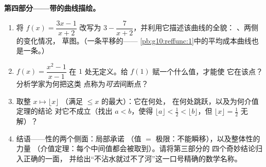 \begin{problem}
\medskip
\noindent\textbf{第四部分——带的曲线描绘。}
\begin{enumerate}[resume]
  \item 将 $f(x) = \dfrac{3x - 1}{x + 2}$ 改写为
        $3 - \dfrac{7}{x + 2}$，并利用它描述该曲线的全貌：
        、两侧的变化情况，
        草图。（一条平移的——
        \cref{pb:g10:reffunc:1}中的平均成本曲线也是一条。）
  \item {} $f(x) = \dfrac{x^2 - 1}{x - 1}$ 在
        $1$ 处无定义。给 $f(1)$ 赋一个什么值，才能使
        它在该点？分析学家为何把这类
        点称为\emph{可去}间断点？
  \item 取整 $x \mapsto \lfloor x \rfloor$
        （满足 $\leq x$ 的最大）：它在何处，
        在何处跳跃，以及为何介值定理的结论
        对它不成立（找出 $a < b$，使得
        $\lfloor a \rfloor < \frac12 < \lfloor b \rfloor$，但
         $\lfloor x \rfloor = \frac12$ 无解）？
  \item 结语——性的两个侧面：局部承诺
        （值 $=$ 极限：不能瞬移），以及整体性的力量
        （介值定理：每个中间值都会被取到）。请将第三部分的
        四个奇妙结论归入正确的一面，
        并给出“不沾水就过不了河”这一口号精确的数学名称。
\end{enumerate}
\end{problem}

